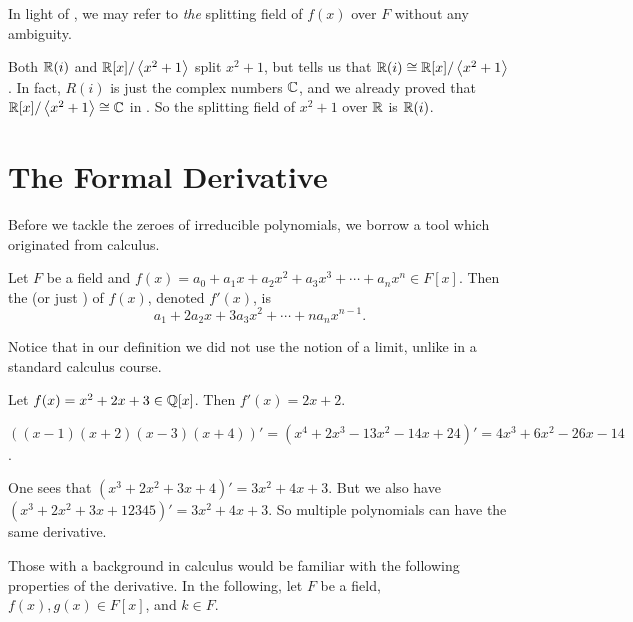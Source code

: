 In light of , we may refer to \textit{the} splitting field of $f(x)$ over $F$ without any ambiguity.

\begin{example}
    Both $\mathbb{R}(i)$ and $\mathbb{R}[x]/\left\langle x^2+1\right\rangle$ split $x^2+1$, but  tells us that $\mathbb{R}(i) \cong \mathbb{R}[x]/\left\langle x^2+1\right\rangle$. In fact, $R(i)$ is just the complex numbers $\mathbb{C}$, and we already proved that $\mathbb{R}[x]/\left\langle x^2+1\right\rangle \cong \mathbb{C}$ in . So the splitting field of $x^2+1$ over $\mathbb{R}$ is $\mathbb{R}(i)$.
\end{example}

\section{The Formal Derivative}
Before we tackle the zeroes of irreducible polynomials, we borrow a tool which originated from calculus.

\begin{definition}
    Let $F$ be a field and $f(x) = a_0 + a_1x + a_2x^2 + a_3x^3 + \cdots + a_nx^n \in F[x]$. Then the  (or just ) of $f(x)$, denoted $f'(x)$, is
    \[
        a_1 + 2a_2x + 3a_3x^2 + \cdots + na_nx^{n-1}.
    \]
\end{definition}

Notice that in our definition we did not use the notion of a limit, unlike in a standard calculus course.

\begin{example}
    Let $f(x) = x^2 + 2x + 3 \in \mathbb{Q}[x]$. Then $f'(x) = 2x + 2$.
\end{example}

\begin{example}
    $\left((x-1)(x+2)(x-3)(x+4)\right)' = (x^4 + 2x^3 - 13x^2 - 14x + 24)' = 4x^3 + 6x^2 - 26x - 14$.
\end{example}

\begin{example}
    One sees that $(x^3 + 2x^2 + 3x + 4)' = 3x^2 + 4x + 3$. But we also have $(x^3 + 2x^2 + 3x + 12345)' = 3x^2 + 4x + 3$. So multiple polynomials can have the same derivative.
\end{example}

Those with a background in calculus would be familiar with the following properties of the derivative. In the following, let $F$ be a field, $f(x), g(x) \in F[x]$, and $k \in F$.

